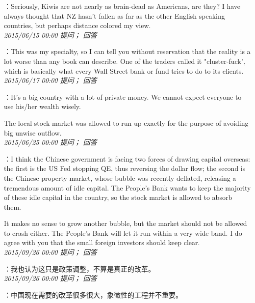 \documentclass[twocolumn]{ctexart}
\begin{document}
：Seriously, Kiwis are not nearly as brain-dead as Americans, are they? I have always thought that NZ hasn't fallen as far as the other English speaking countries, but perhaps distance colored my view.\\

\textit{\hfill\noindent\small 2015/06/15 00:00 提问； 回答}

：This was my specialty, so I can tell you without reservation that the reality is a lot worse than any book can describe. One of the traders called it "cluster-fuck", which is basically what every Wall Street bank or fund tries to do to its clients.\\

\textit{\hfill\noindent\small 2015/06/17 00:00 提问； 回答}

：It's a big country with a lot of private money. We cannot expect everyone to use his/her wealth wisely.

The local stock market was allowed to run up exactly for the purpose of avoiding big unwise outflow.\\

\textit{\hfill\noindent\small 2015/06/25 00:00 提问； 回答}

：I think the Chinese government is facing two forces of drawing capital overseas: the first is the US Fed stopping QE, thus reversing the dollar flow; the second is the Chinese property market, whose bubble was recently deflated, releasing a tremendous amount of idle capital. The People's Bank wants to keep the majority of these idle capital in the country, so the stock market is allowed to absorb them.

It makes no sense to grow another bubble, but the market should not be allowed to crash either. The People's Bank will let it run within a very wide band. I do agree with you that the small foreign investors should keep clear.
\\

\textit{\hfill\noindent\small 2015/09/26 00:00 提问； 回答}

：我也认为这只是政策调整，不算是真正的改革。\\

\textit{\hfill\noindent\small 2015/09/26 00:00 提问； 回答}

：中国现在需要的改革很多很大，象徵性的工程并不重要。\\
\end{document}
